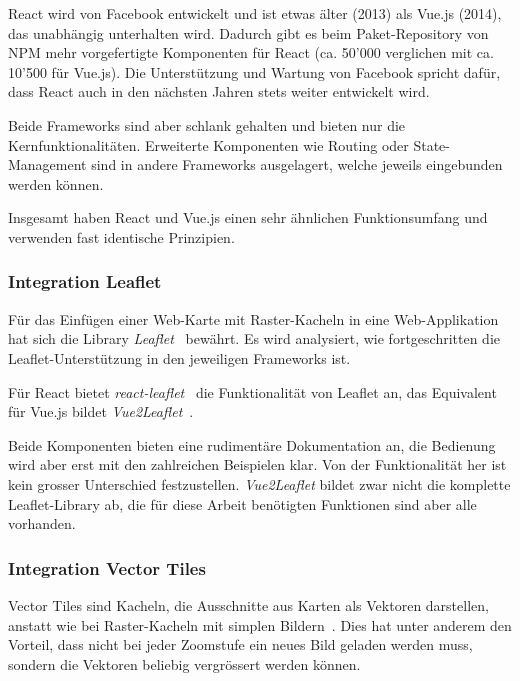 React wird von Facebook entwickelt und ist etwas älter (2013) als Vue.js (2014), das unabhängig unterhalten wird.
Dadurch gibt es beim Paket-Repository von NPM mehr vorgefertigte Komponenten für React (ca. 50'000 verglichen mit ca. 10'500 für Vue.js).
Die Unterstützung und Wartung von Facebook spricht dafür, dass React auch in den nächsten Jahren stets weiter entwickelt wird.

Beide Frameworks sind aber schlank gehalten und bieten nur die Kernfunktionalitäten.
Erweiterte Komponenten wie Routing oder State-Management sind in andere Frameworks ausgelagert, welche jeweils eingebunden werden können.

Insgesamt haben React und Vue.js einen sehr ähnlichen Funktionsumfang und verwenden fast identische Prinzipien.

\subsubsection{Integration Leaflet}
\label{Analyse Framework:Integration Leaflet}

Für das Einfügen einer Web-Karte mit Raster-Kacheln in eine Web-Applikation hat sich die Library \emph{Leaflet}~\cite{leaflet} bewährt.
Es wird analysiert, wie fortgeschritten die Leaflet-Unterstützung in den jeweiligen Frameworks ist.

Für React bietet \emph{react-leaflet}~\cite{react-leaflet} die Funktionalität von Leaflet an, das Equivalent für Vue.js bildet \emph{Vue2Leaflet}~\cite{vue2leaflet}.

Beide Komponenten bieten eine rudimentäre Dokumentation an, die Bedienung wird aber erst mit den zahlreichen Beispielen klar.
Von der Funktionalität her ist kein grosser Unterschied festzustellen.
\emph{Vue2Leaflet} bildet zwar nicht die komplette Leaflet-Library ab, die für diese Arbeit benötigten Funktionen sind aber alle vorhanden.


\subsubsection{Integration Vector Tiles}
\label{Analyse Framework:Integration Vector Tiles}

Vector Tiles sind Kacheln, die Ausschnitte aus Karten als Vektoren darstellen, anstatt wie bei Raster-Kacheln mit simplen Bildern~\cite{geometalab_vectortiles}.
Dies hat unter anderem den Vorteil, dass nicht bei jeder Zoomstufe ein neues Bild geladen werden muss, sondern die Vektoren beliebig vergrössert werden können.

